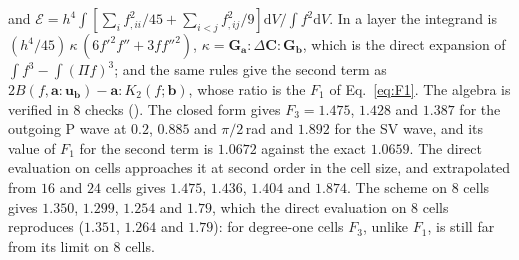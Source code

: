\documentclass[11pt,a4paper]{article}
\newcommand{\cE}{\mathcal{E}}
\newcommand{\dd}{\mathrm{d}}
\begin{document}
and $\cE=h^4\int[\sum_if_{,ii}^2/45+\sum_{i<j}f_{,ij}^2/9]\dd V/\int f^2\dd V$. In a layer the integrand is
$(h^4/45)\,\kappa\,(6f'^2f''+3ff''^2)$, $\kappa=\mathbf{G}_{\mathbf{a}}:\Delta\mathbf{C}:\mathbf{G}_{\mathbf{b}}$,
which is the direct expansion of $\int f^3-\int(\Pi f)^3$; and the same rules give the second term as
$2B(f,\mathbf{a}:\mathbf{u}_{\mathbf{b}})-\mathbf{a}:K_2(f;\mathbf{b})$, whose ratio is the $F_1$ of
Eq.~\eqref{eq:F1}. The algebra is verified in $8$ checks ().
The closed form gives $F_3=1.475$, $1.428$ and $1.387$ for the outgoing P wave at $0.2$, $0.885$ and
$\pi/2$\,rad and $1.892$ for the SV wave, and its value of $F_1$ for the second term is $1.0672$ against
the exact $1.0659$. The direct evaluation on cells approaches it at second order in the cell size, and
extrapolated from $16$ and $24$ cells gives $1.475$, $1.436$, $1.404$ and $1.874$. The scheme on $8$
cells gives $1.350$, $1.299$, $1.254$ and $1.79$, which the direct evaluation on $8$ cells reproduces
($1.351$, $1.264$ and $1.79$): for degree-one cells $F_3$, unlike $F_1$, is still far from its limit on $8$
cells.
\end{document}
